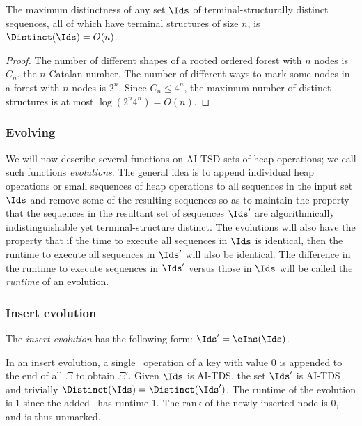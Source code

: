\begin{lemma} 
The maximum distinctness of any set $\Ids$ of terminal-structurally distinct sequences, all of which have terminal structures of size $n$, is $\Distinct(\Ids)=O(n)$.
\end{lemma}

\begin{fullonly}
\begin{proof}
The number of different shapes of a rooted ordered forest with $n$ nodes is $C_n$, the $n$ Catalan number. The number of different ways to mark some nodes in a forest with $n$ nodes is $2^n$. Since $C_n \leq 4^n$, the maximum number of distinct structures is at most $\log (2^n4^n) = O(n)$. 
\end{proof}
\end{fullonly}



\subsubsection{Evolving} 

We will now describe several functions on AI-TSD sets of heap operations; we call such functions \emph{evolutions}. The general idea is to append individual heap operations or small sequences of heap operations to all sequences in the input set $\Ids$ and remove some of the resulting sequences so as to maintain the property that the sequences in the resultant set of sequences $\Ids'$ are algorithmically indistinguishable yet terminal-structure distinct. The evolutions will also have the property that if the time to execute all sequences in $\Ids$ is identical, then the runtime to execute all sequences in $\Ids'$ will also be identical. The difference in the runtime to execute sequences in $\Ids'$ versus those in $\Ids$ will be called the \emph{runtime} of an evolution.



\subsubsection{Insert evolution} 

The \emph{insert evolution} has the following form: $\Ids' = \eIns(\Ids)$.
\begin{fullonly}

\end{fullonly}
In an insert evolution, a single \opIns\ operation of a key with value 0 is appended to the end of all $\Xi$ to obtain $\Xi'$. Given $\Ids$ is AI-TDS, the set $\Ids'$ is AI-TDS and trivially $\Distinct(\Ids)=\Distinct(\Ids')$. The runtime of the evolution is 1 since the added \opIns\ has runtime 1. The rank of the newly inserted node is 0, and is thus unmarked.



